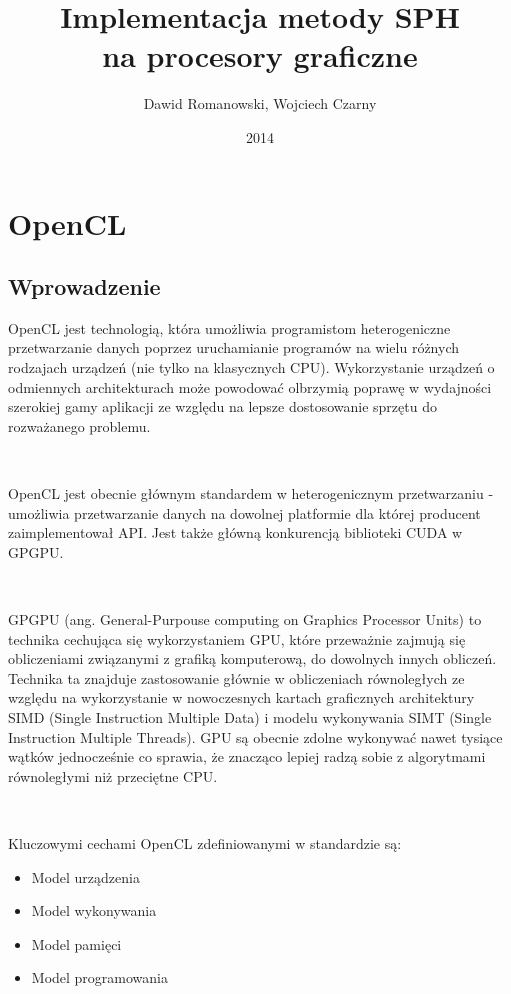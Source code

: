 \documentclass[polish, 12pt]{aghthesis}
\author{Dawid Romanowski, Wojciech Czarny}
\title{Implementacja metody SPH \\ na procesory graficzne}
\date{2014}
\begin{document}
\raggedbottom
\maketitle{}
\tableofcontents
\clearpage

\section{OpenCL}
 
	\subsection{Wprowadzenie}
	
	 OpenCL jest technologią, która umożliwia programistom heterogeniczne przetwarzanie danych poprzez uruchamianie programów na wielu różnych rodzajach urządzeń (nie tylko na klasycznych CPU). Wykorzystanie urządzeń o odmiennych architekturach może powodować olbrzymią poprawę w wydajności szerokiej gamy aplikacji ze względu na lepsze dostosowanie sprzętu do rozważanego problemu.
	 	 
	$\,$	 	 
	 	 
	 OpenCL jest obecnie głównym standardem w heterogenicznym przetwarzaniu - umożliwia przetwarzanie danych na dowolnej platformie dla której producent zaimplementował API. Jest także główną konkurencją biblioteki CUDA w GPGPU.
	 
	$\,$	 
	 
	 GPGPU (ang. General-Purpouse computing on Graphics Processor Units) to technika cechująca się wykorzystaniem GPU, które przeważnie zajmują się obliczeniami związanymi z grafiką komputerową, do dowolnych innych obliczeń. Technika ta znajduje zastosowanie głównie w obliczeniach równoległych ze względu na wykorzystanie w nowoczesnych kartach graficznych architektury SIMD (Single Instruction Multiple Data) i modelu wykonywania SIMT (Single Instruction Multiple Threads). GPU są obecnie zdolne wykonywać nawet tysiące wątków jednocześnie co sprawia, że znacząco lepiej radzą sobie z algorytmami równoległymi niż przeciętne CPU. 
	 
	 $\,$
	
	Kluczowymi cechami OpenCL zdefiniowanymi w standardzie są:
	\begin{itemize}
	\item Model urządzenia
	\item Model wykonywania
	\item Model pamięci
	\item Model programowania
	\end{itemize}
	
\end{document}
